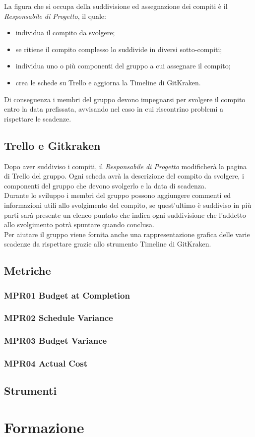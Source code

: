 La figura che si occupa della suddivisione ed assegnazione dei compiti è il \textit{Responsabile di Progetto}, il quale:
\begin{itemize}
	\item individua il compito da svolgere;
	\item se ritiene il compito complesso lo suddivide in diversi sotto-compiti;
	\item individua uno o più componenti del gruppo a cui assegnare il compito;
	\item crea le schede su Trello e aggiorna la Timeline di GitKraken.
\end{itemize}

Di conseguenza i membri del gruppo devono impegnarsi per svolgere il compito entro la data prefissata, avvisando nel caso in cui riscontrino problemi a rispettare le scadenze.

\subsection{Trello e Gitkraken}\label{4.2.4}

Dopo aver suddiviso i compiti, il \textit{Responsabile di Progetto} modificherà la pagina di Trello del gruppo. Ogni scheda avrà la descrizione del compito da svolgere, i componenti del gruppo che devono svolgerlo e la data di scadenza. \\
Durante lo sviluppo i membri del gruppo possono aggiungere commenti ed informazioni utili allo svolgimento del compito, se quest'ultimo è suddiviso in più parti sarà presente un elenco puntato che indica ogni suddivisione che l'addetto allo svolgimento potrà spuntare quando conclusa. \\
Per aiutare il gruppo viene fornita anche una rappresentazione grafica delle varie scadenze da rispettare grazie allo strumento Timeline di GitKraken.

\subsection{Metriche}\label{4.2.5}

\subsubsection{MPR01 Budget at Completion}\label{4.2.5.1}

\subsubsection{MPR02 Schedule Variance}\label{4.2.5.2}

\subsubsection{MPR03 Budget Variance}\label{4.2.5.3}

\subsubsection{MPR04 Actual Cost}\label{4.2.5.4}

\subsection{Strumenti}\label{4.2.6}

\section{Formazione}\label{4.3}